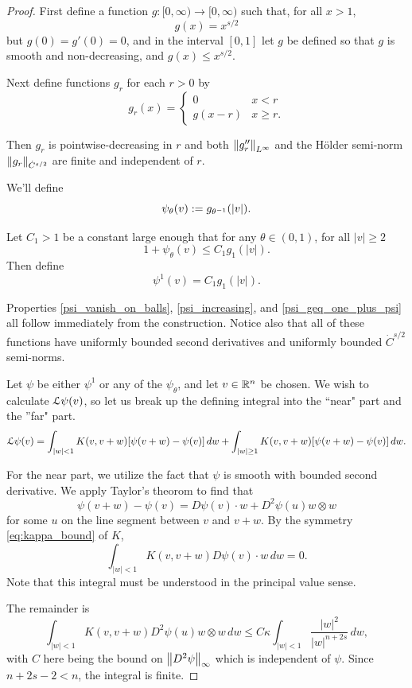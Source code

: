 \begin{proof}
First define a function $g:[0,\infty) \to [0,\infty)$ such that, for all $x > 1$,
\[ g(x) = x^{s/2} \] %
but $g(0) = g'(0) = 0$, and in the interval $[0,1]$ let $g$ be defined so that $g$ is smooth and non-decreasing, and $g(x) \leq x^{s/2}$.  

Next define functions $g_r$ for each $r > 0$ by
\[ g_r(x) = \begin{cases}
0 & x < r  \\
g(x-r) & x \geq r.
\end{cases}\] 

Then $g_r$ is pointwise-decreasing in $r$ and both $\left\lVert g_r''\right\rVert_{L^\infty}$ and the H\"{o}lder semi-norm $\left\lVert g_r\right\rVert_{\dot{C}^{s/2}}$ are finite and independent of $r$.  

We'll define
\[ \psi_\theta(v) := g_{\theta^{-1}}(|v|). \]

Let $C_1 > 1$ be a constant large enough that for any $\theta \in (0,1)$, for all $|v| \geq 2$
\[ 1 + \psi_\theta(v) \leq C_1 g_1(|v|). \]
Then define
\[ \psi^1(v) = C_1 g_1(|v|). \]

Properties \eqref{psi_vanish_on_balls}, \eqref{psi_increasing}, and \eqref{psi_geq_one_plus_psi} all follow immediately from the construction.  Notice also that all of these functions have uniformly bounded second derivatives and uniformly bounded $\dot{C}^{s/2}$ semi-norms.  

Let $\psi$ be either $\psi^1$ or any of the $\psi_\theta$, and let $v \in \mathbb{R}^n$ be chosen.  We wish to calculate $\mathcal{L}\psi(v)$, so let us break up the defining integral into the ``near" part and the ''far" part.  
\[ \mathcal{L} \psi(v) = \int_{|w|<1} K(v,v+w)[\psi(v+w)-\psi(v)] \,dw + \int_{|w|\geq 1} K(v,v+w)[\psi(v+w)-\psi(v)] \,dw. \]

For the near part, we utilize the fact that $\psi$ is smooth with bounded second derivative.  
We apply Taylor's theorom to find that
\[ \psi(v+w)-\psi(v) = D\psi(v)\cdot w + D^2\psi(u) w \otimes w \]
for some $u$ on the line segment between $v$ and $v+w$.  By the symmetry \eqref{eq:kappa_bound} of $K$,
\[ \int_{|w|<1} K(v,v+w) D\psi(v)\cdot w \,dw = 0. \]  
Note that this integral must be understood in the principal value sense.  

The remainder is 
\[ \int_{|w|<1} K(v,v+w)D^2\psi(u) w \otimes w \,dw \leq C \kappa \int_{|w|<1} \frac{|w|^2}{|w|^{n+2s}} \,dw, \]
with $C$ here being the bound on $\left\lVert D^2\psi\right\rVert_\infty$ which is independent of $\psi$.  
Since $n + 2s - 2 < n$, the integral is finite.  


\end{proof}
